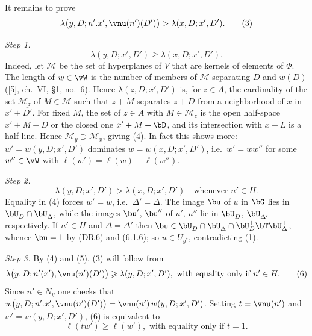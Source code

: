 \documentclass[12pt,a4paper,oneside,english]{smfart}
\newcommand{\btref}[1]{\hyperlink{bt:#1}{#1}}
\newcommand{\btbib}[1]{\hyperlink{bib:#1}{#1}}
\theoremstyle{definition}
\theoremstyle{bt}
\begin{document}
It remains to prove
\begin{equation}
  \lambda\bigl(y,D;n'.x',\vnu(n')(D')\bigr)>\lambda(x,D;x',D'). \tag{3}
\end{equation}

\emph{Step 1.}
\begin{equation}
  \lambda(y,D;x',D')\geqslant\lambda(x,D;x',D'). \tag{4}
\end{equation}
Indeed, let $\mathscr{M}$ be the set of hyperplanes of $V$ that are kernels of
elements of $\Phi$. The length of $w\in\vW$ is the number of members of
$\mathscr{M}$ separating $D$ and $w(D)$ ([\btbib{5}], ch.~VI, \S1, no.~6). Hence
$\lambda(z,D;x',D')$ is, for $z\in A$, the cardinality of the set $\mathscr{M}_z$ of
$M\in\mathscr{M}$ such that $z+M$ separates $z+D$ from a neighborhood of $x$ in
$x'+\overline{D'}$. For fixed $M$, the set of $z\in A$ with $M\in\mathscr{M}_z$ is
the open half-space $x'+M+D$ or the closed one $x'+M+\bD$, and its intersection with
$x+L$ is a half-line. Hence $\mathscr{M}_y\supset\mathscr{M}_x$, giving (4).
In fact this shows more: $w'=w(y,D;x',D')$ dominates $w=w(x,D;x',D')$, i.e.\
$w'=ww''$ for some $w''\in\vW$ with $\ell(w')=\ell(w)+\ell(w'')$.

\emph{Step 2.}
\begin{equation}
  \lambda(y,D;x',D')>\lambda(x,D;x',D')\quad\text{whenever }n'\in H. \tag{5}
\end{equation}
Equality in (4) forces $w'=w$, i.e.\ $\Delta'=\Delta$. The image $\bu$ of $u$ in
$\bG$ lies in $\bU_D^{-}\cap\bU_\Delta^{-}$, while the images $\bu'$, $\bu''$ of
$u'$, $u''$ lie in $\bU_D^{+}$, $\bU_{\Delta'}^{+}$ respectively. If $n'\in H$ and
$\Delta=\Delta'$ then
$\bu\in\bU_D^{-}\cap\bU_\Delta^{-}\cap\bU_D^{+}\bT\bU_\Delta^{+}$, whence $\bu=1$ by
(DR\,6) and (\btref{6.1.6}); so $u\in U_{y^{*}}$, contradicting (1).

\emph{Step 3.} By (4) and (5), (3) will follow from
\begin{equation}
  \lambda\bigl(y,D;n'(x'),\vnu(n')(D')\bigr)\geqslant\lambda(y,D;x',D'),
  \text{ with equality only if }n'\in H. \tag{6}
\end{equation}
Since $n'\in N_y$ one checks that
$w\bigl(y,D;n'.x',\vnu(n')(D')\bigr)=\vnu(n')\,w(y,D;x',D')$. Setting
$t=\vnu(n')$ and $w'=w(y,D;x',D')$, (6) is equivalent to
\begin{equation}
  \ell(tw')\geqslant\ell(w'),\text{ with equality only if }t=1. \tag{7}
\end{equation}
\end{document}
